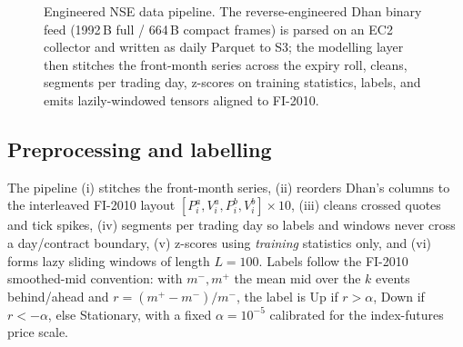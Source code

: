 \documentclass[10pt,twocolumn]{article}
\begin{document}
\begin{figure}[t]
\centering
{}
\caption{Engineered NSE data pipeline. The reverse-engineered Dhan binary feed (1992\,B full / 664\,B compact
frames) is parsed on an EC2 collector and written as daily Parquet to S3; the modelling layer then stitches
the front-month series across the expiry roll, cleans, segments per trading day, z-scores on training
statistics, labels, and emits lazily-windowed tensors aligned to FI-2010.}
\label{fig:pipeline}
\end{figure}

\subsection{Preprocessing and labelling}
The pipeline (i) stitches the front-month series, (ii) reorders Dhan's columns to the interleaved FI-2010
layout $[P^a_i,V^a_i,P^b_i,V^b_i]\times 10$, (iii) cleans crossed quotes and tick spikes, (iv) segments per
trading day so labels and windows never cross a day/contract boundary, (v) z-scores using \emph{training}
statistics only, and (vi) forms lazy sliding windows of length $L=100$. Labels follow the FI-2010 smoothed-mid
convention: with $m^-,m^+$ the mean mid over the $k$ events behind/ahead and $r=(m^+-m^-)/m^-$, the label is
Up if $r>\alpha$, Down if $r<-\alpha$, else Stationary, with a fixed $\alpha=10^{-5}$ calibrated for the
index-futures price scale.
\end{document}
